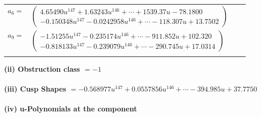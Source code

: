 \documentclass[1p]{elsarticle_modified}
\theoremstyle{definition}
\begin{document}
\begin{tabular}{m{7pt} m{180pt} m{7pt} m{180pt} }
\flushright $a_{6}=$&$\begin{pmatrix}4.65490 u^{147}+1.63243 u^{146}+\cdots+1539.37 u-78.1800\\-0.150348 u^{147}-0.0242958 u^{146}+\cdots-118.307 u+13.7502\end{pmatrix}$ \\
\flushright $a_{9}=$&$\begin{pmatrix}-1.51255 u^{147}-0.235174 u^{146}+\cdots-911.852 u+102.320\\-0.818133 u^{147}-0.239079 u^{146}+\cdots-290.745 u+17.0314\end{pmatrix}$\\&\end{tabular}
\flushleft \textbf{(ii) Obstruction class $= -1$}\\~\\
\flushleft \textbf{(iii) Cusp Shapes $= -0.568977 u^{147}+0.0557856 u^{146}+\cdots-394.985 u+37.7750$}\\~\\
\newpage\renewcommand{\arraystretch}{1}
\flushleft \textbf{(iv) u-Polynomials at the component}\newline \\
\end{document}
